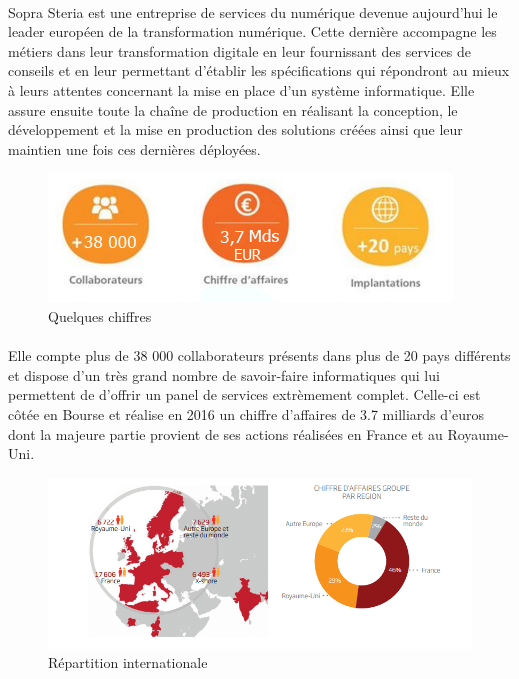 \paragraph{}
Sopra Steria est une entreprise de services du numérique devenue aujourd'hui le leader européen de la transformation numérique. Cette dernière accompagne les métiers dans leur transformation digitale en leur fournissant des services de conseils et en leur permettant d'établir les spécifications qui répondront au mieux à leurs attentes concernant la mise en place d'un système informatique. Elle assure ensuite toute la chaîne de production en réalisant la conception, le développement et la mise en production des solutions créées ainsi que leur maintien une fois ces dernières déployées.

\begin{figure}[h]
	\includegraphics[scale=1]{images/sopraSteriaChiffres.png}
	\centering
	\caption{Quelques chiffres}
	\label{sopraSteriaChiffres}
\end{figure}

\paragraph{}
Elle compte plus de 38 000 collaborateurs présents dans plus de 20 pays différents et dispose d'un très grand nombre de savoir-faire informatiques qui lui permettent de d'offrir un panel de services extrèmement complet. Celle-ci est côtée en Bourse et réalise en 2016 un chiffre d'affaires de 3.7 milliards d'euros dont la majeure partie provient de ses actions réalisées en France et au Royaume-Uni.

\begin{figure}[h]
	\includegraphics[scale=0.9]{images/sopraSteriaMonde.png}
	\centering
	\caption{Répartition internationale}
	\label{sopraSteriaMonde}
\end{figure}
		
		